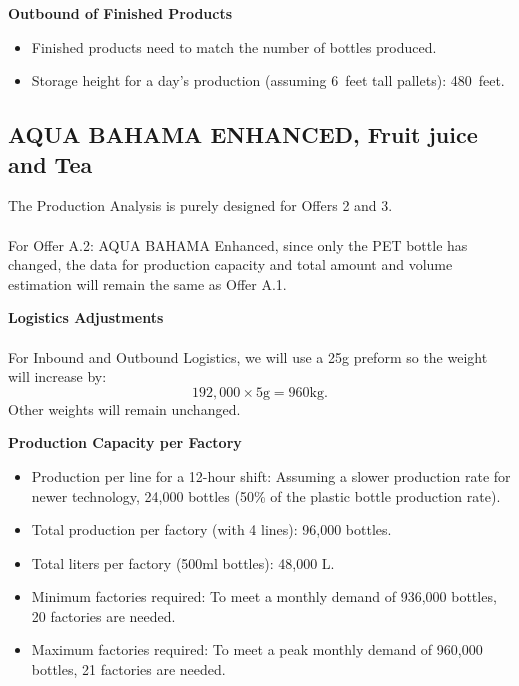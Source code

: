 \documentclass{article}
\begin{document}
\textbf{Outbound of Finished Products}\par
\begin{itemize}
    \item Finished products need to match the number of bottles produced.
    \item Storage height for a day’s production (assuming \SI{6}{feet} tall pallets): \SI{480}{feet}.
\end{itemize}

\subsection{AQUA BAHAMA ENHANCED, Fruit juice and Tea}\par
The Production Analysis is purely designed for Offers 2 and 3.\par
\paragraph{} For Offer A.2: AQUA BAHAMA Enhanced, since only the PET bottle has changed, the data for production capacity and total amount and volume estimation will remain the same as Offer A.1.\par

\textbf{Logistics Adjustments}\par
\paragraph{} For Inbound and Outbound Logistics, we will use a 25g preform so the weight will increase by:
\[ 192,000 \times 5\text{g} = 960\text{kg}. \]
Other weights will remain unchanged.

\textbf{Production Capacity per Factory}
\begin{itemize}
    \item Production per line for a 12-hour shift: Assuming a slower production rate for newer technology, 24,000 bottles (50\% of the plastic bottle production rate).
    \item Total production per factory (with 4 lines): 96,000 bottles.
    \item Total liters per factory (500ml bottles): 48,000 L.
    \item Minimum factories required: To meet a monthly demand of 936,000 bottles, 20 factories are needed.
    \item Maximum factories required: To meet a peak monthly demand of 960,000 bottles, 21 factories are needed.
\end{itemize}
\end{document}

